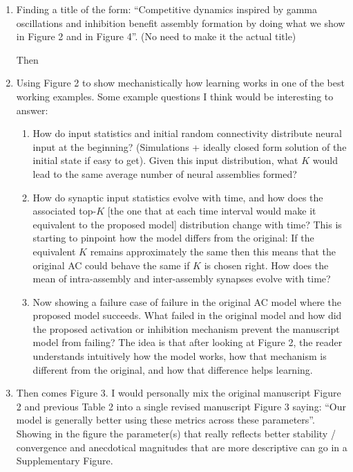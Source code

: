 \documentclass[a4paper, 11pt]{article}
\begin{document}
\begin{enumerate}
    \item Finding a title of the form: ``Competitive dynamics inspired by gamma oscillations and inhibition benefit assembly formation by doing what we show in Figure 2 and in Figure 4''. (No need to make it the actual title)
    
    Then
    
    \item Using Figure 2 to show mechanistically how learning works in one of the best working examples. Some example questions I think would be interesting to answer:
    \begin{enumerate}
        \item[2.1 -] How do input statistics and initial random connectivity distribute neural input at the beginning? (Simulations + ideally closed form solution of the initial state if easy to get). Given this input distribution, what $K$ would lead to the same average number of neural assemblies formed?
        \item[2.2 -] How do synaptic input statistics evolve with time, and how does the associated top-$K$ [the one that at each time interval would make it equivalent to the proposed model] distribution change with time? This is starting to pinpoint how the model differs from the original: If the equivalent $K$ remains approximately the same then this means that the original AC could behave the same if $K$ is chosen right. How does the mean of intra-assembly and inter-assembly synapses evolve with time?
        \item[2.3 -] Now showing a failure case of failure in the original AC model where the proposed model succeeds. What failed in the original model and how did the proposed activation or inhibition mechanism prevent the manuscript model from failing? The idea is that after looking at Figure 2, the reader understands intuitively how the model works, how that mechanism is different from the original, and how that difference helps learning.
    \end{enumerate}
    
    \item Then comes Figure 3. I would personally mix the original manuscript Figure 2 and previous Table 2 into a single revised manuscript Figure 3 saying: ``Our model is generally better using these metrics across these parameters''. Showing in the figure the parameter(s) that really reflects better stability / convergence and anecdotical magnitudes that are more descriptive can go in a Supplementary Figure.
    

\end{enumerate}
\end{document}
